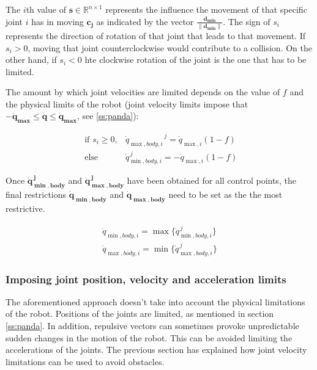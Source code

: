 The $i$th value of $\mathbf{s} \in \mathbb{R}^{n \times 1}$ represents the influence the movement of that specific joint $i$ has in moving $\mathbf{c_{j}}$ as indicated by the vector $\frac{\mathbf{d_{min}}}{\|\mathbf{d_{min}}\|}$. The sign of $s_i$ represents the direction of rotation of that joint that leads to that movement. If $s_i > 0$, moving that joint counterclockwise would contribute to a collision. On the other hand, if $s_i < 0$ hte clockwise rotation of the joint is the one that has to be limited.

The amount by which joint velocities are limited depends on the value of $f$ and the physical limits of the robot (joint velocity limits impose that $-\mathbf{\dot{q}_{\max}} \leq \mathbf{\dot{q}} \leq \mathbf{\dot{q}_{\max}}$, see \ref{ss:panda}):


\begin{equation*}
    \begin{array}{ll}
        \text { if } s_{i} \geq 0, & {\dot{q}_{\max, body , i}}^{\, j}=\dot{q}_{\max, i}\left.\left(1-f\right)\right. \\
        \text { else } & \dot{q}_{\min, body , i}^{\, j}=-\dot{q}_{\max, i}\left.\left(1-f\right)\right.
    \end{array}
\end{equation*}

Once $\mathbf{\dot{q}_{\min, body}^{\, j}}$ and $\mathbf{\dot{q}_{\max, body}^{\, j}}$ have been obtained for all control points, the final restrictions $\mathbf{\dot{q}_{\min, body}}$ and $\mathbf{\dot{q}_{\max, body}}$ need to be set as the the most restrictive.

\begin{equation*}
    \begin{array}{l}
        \dot{q}_{\min, body , i} = \max \{\dot{q}_{\min, body , i}^{\, j}\} \\
        \dot{q}_{\max, body , i} = \min \{\dot{q}_{\max, body , i}^{\, j}\}
    \end{array}
\end{equation*}

\subsubsection{Imposing joint position, velocity and acceleration limits}
\label{sss:kinematiclimits}

The aforementioned approach doesn't take into account the physical limitations of the robot. Positions of the joints are limited, as mentioned in section \ref{ss:panda}. In addition, repulsive vectors can sometimes provoke unpredictable sudden changes in the motion of the robot. This can be avoided limiting the accelerations of the joints. The previous section has explained how joint velocity limitations can be used to avoid obstacles.

